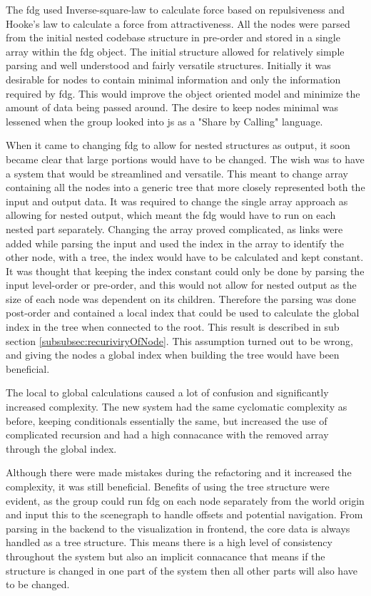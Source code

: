 The \gls{fdg} used Inverse-square-law to calculate force based on repulsiveness and Hooke's law to calculate a force from attractiveness. All the nodes were parsed from the initial nested codebase structure in pre-order and stored in a single array within the \gls{fdg} object.
The initial structure allowed for relatively simple parsing and well understood and fairly versatile structures. Initially it was desirable for nodes to contain minimal information and only the information required by \gls{fdg}. This would improve the object oriented model and minimize the amount of data being passed around. The desire to keep nodes minimal was lessened when the group looked into \gls{js} as a "Share by Calling" language. 

When it came to changing \gls{fdg} to allow for nested structures as output, it soon became clear that large portions would have to be changed. The wish was to have a system that would be streamlined and versatile. This meant to change array containing all the nodes into a generic tree that more closely represented both the input and output data. It was required to change the single array approach as allowing for nested output, which meant the \gls{fdg} would have to run on each nested part separately. Changing the array proved complicated, as links were added while parsing the input and used the index in the array to identify the other node, with a tree, the index would have to be calculated and kept constant. It was thought that keeping the index constant could only be done by parsing the input level-order or pre-order, and this would not allow for nested output as the size of each node was dependent on its children. Therefore the parsing was done post-order and contained a local index that could be used to calculate the global index in the tree when connected to the root. This result is described in sub section \ref{subsubsec:recuriviryOfNode}. This assumption turned out to be wrong, and giving the nodes a global index when building the tree would have been beneficial.

The local to global calculations caused a lot of confusion and significantly increased complexity. The new system had the same cyclomatic complexity as before, keeping conditionals essentially the same, but increased the use of complicated \gls{recursion} and had a high connacance with the removed array through the global index.

Although there were made mistakes during the refactoring and it increased the complexity, it was still beneficial. Benefits of using the tree structure were evident, as the group could run \gls{fdg} on each node separately from the world origin and input this to the \gls{scenegraph} to handle offsets and potential navigation. From parsing in the \gls{backend} to the visualization in \gls{frontend}, the core data is always handled as a tree structure. This means there is a high level of consistency throughout the system but also an implicit connacance that means if the structure is changed in one part of the system then all other parts will also have to be changed.


